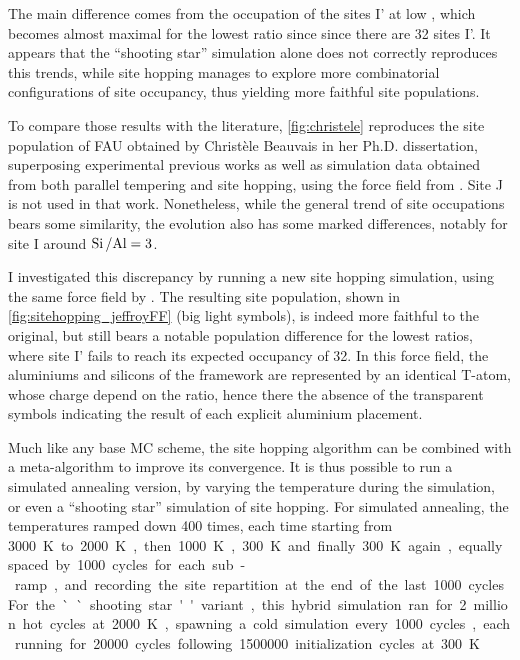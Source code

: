 \documentclass[main.tex]{subfiles}
\begin{document}
The main difference comes from the occupation of the sites I' at low \SiAl, which becomes almost maximal for the lowest ratio since since there are 32 sites I'. It appears that the ``shooting star'' simulation alone does not correctly reproduces this trends, while site hopping manages to explore more combinatorial configurations of site occupancy, thus yielding more faithful site populations.

To compare those results with the literature, \cref{fig:christele} reproduces the site population of FAU obtained by Christèle Beauvais in her Ph.D. dissertation, superposing experimental previous works as well as simulation data obtained from both parallel tempering and site hopping, using the force field from \textcite{DiLellaFF}. Site J is not used in that work. Nonetheless, while the general trend of site occupations bears some similarity, the evolution also has some marked differences, notably for site I around $\mbox{Si\,/Al} = 3$.

I investigated this discrepancy by running a new site hopping simulation, using the same force field by \textcite{DiLellaFF}. The resulting site population, shown in \cref{fig:sitehopping_jeffroyFF} (big light symbols), is indeed more faithful to the original, but still bears a notable population difference for the lowest \SiAl ratios, where site I' fails to reach its expected occupancy of 32. In this force field, the aluminiums and silicons of the framework are represented by an identical T-atom, whose charge depend on the \SiAl ratio, hence there the absence of the transparent symbols indicating the result of each explicit aluminium placement.

Much like any base MC scheme, the site hopping algorithm can be combined with a meta-algorithm to improve its convergence. It is thus possible to run a simulated annealing version, by varying the temperature during the simulation, or even a ``shooting star'' simulation of site hopping. For simulated annealing, the temperatures ramped down \num{400} times, each time starting from \qty{3000}K to \qty{2000}K, then \qty{1000}K, \qty{300}K and finally \qty{300}K again, equally spaced by \num{1000} cycles for each sub-ramp, and recording the site repartition at the end of the last \num{1000} cycles. For the ``shooting star'' variant, this hybrid simulation ran for 2 million hot cycles at \qty{2000}K, spawning a cold simulation every \num{1000} cycles, each running for \num{20000} cycles following \num{1500000} initialization cycles at \qty{300}K.\label{sitehopping_simulatedannealing}
\end{document}
